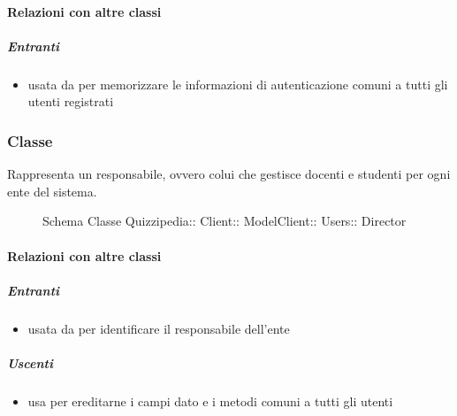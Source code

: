 \paragraph{Relazioni con altre classi}
\subparagraph{Entranti}
\begin{itemize}
\item usata da  per memorizzare le informazioni di autenticazione comuni a tutti gli utenti registrati
\end{itemize}
\subsubsection{Classe }
Rappresenta un responsabile, ovvero colui che gestisce docenti e studenti per ogni ente del sistema.
\begin{figure}[H]
\centering
\noindent{}
\caption[Schema Classe Director]{Schema Classe Quizzipedia:: Client:: ModelClient:: Users:: Director}
\end{figure}
\paragraph{Relazioni con altre classi}
\subparagraph{Entranti}
\begin{itemize}
\item usata da  per identificare il responsabile dell'ente
\end{itemize}
\subparagraph{Uscenti}
\begin{itemize}
\item usa  per ereditarne i campi dato e i metodi comuni a tutti gli utenti
\end{itemize}
